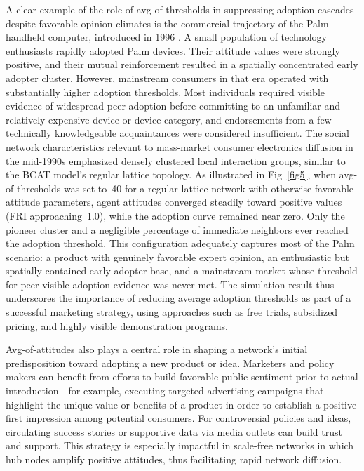 \documentclass[10pt,letterpaper]{article}
\begin{document}
A clear example of the role of avg-of-thresholds in suppressing adoption cascades despite favorable opinion climates is the commercial trajectory of the Palm handheld computer, introduced in 1996 \cite{Zheng2006}. A small population of technology enthusiasts rapidly adopted Palm devices. Their attitude values were strongly positive, and their mutual reinforcement resulted in a spatially concentrated early adopter cluster. However, mainstream consumers in that era operated with substantially higher adoption thresholds. Most individuals required visible evidence of widespread peer adoption before committing to an unfamiliar and relatively expensive device or device category, and endorsements from a few technically knowledgeable acquaintances were considered insufficient. The social network characteristics relevant to mass-market consumer electronics diffusion in the mid-1990s emphasized densely clustered local interaction groups, similar to the BCAT model's regular lattice topology. As illustrated in Fig~\ref{fig5}, when avg-of-thresholds was set to~40 for a regular lattice network with otherwise favorable attitude parameters, agent attitudes converged steadily toward positive values (FRI approaching~1.0), while the adoption curve remained near zero. Only the pioneer cluster and a negligible percentage of immediate neighbors ever reached the adoption threshold. This configuration adequately captures most of the Palm scenario: a product with genuinely favorable expert opinion, an enthusiastic but spatially contained early adopter base, and a mainstream market whose threshold for peer-visible adoption evidence was never met. The simulation result thus underscores the importance of reducing average adoption thresholds as part of a successful marketing strategy, using approaches such as free trials, subsidized pricing, and highly visible demonstration programs.

Avg-of-attitudes also plays a central role in shaping a network's initial predisposition toward adopting a new product or idea. Marketers and policy makers can benefit from efforts to build favorable public sentiment prior to actual introduction---for example, executing targeted advertising campaigns that highlight the unique value or benefits of a product in order to establish a positive first impression among potential consumers. For controversial policies and ideas, circulating success stories or supportive data via media outlets can build trust and support. This strategy is especially impactful in scale-free networks in which hub nodes amplify positive attitudes, thus facilitating rapid network diffusion.
\end{document}
